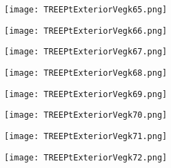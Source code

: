 \documentclass[pdf]{beamer}
\begin{document}
\begin{frame}
\begin{figure}[!h]
\centering
\texttt{[image: TREEPtExteriorVegk65.png]}
\end{figure}
\end{frame}

\begin{frame}
\begin{figure}[!h]
\centering
\texttt{[image: TREEPtExteriorVegk66.png]}
\end{figure}
\end{frame}

\begin{frame}
\begin{figure}[!h]
\centering
\texttt{[image: TREEPtExteriorVegk67.png]}
\end{figure}
\end{frame}

\begin{frame}
\begin{figure}[!h]
\centering
\texttt{[image: TREEPtExteriorVegk68.png]}
\end{figure}
\end{frame}

\begin{frame}
\begin{figure}[!h]
\centering
\texttt{[image: TREEPtExteriorVegk69.png]}
\end{figure}
\end{frame}

\begin{frame}
\begin{figure}[!h]
\centering
\texttt{[image: TREEPtExteriorVegk70.png]}
\end{figure}
\end{frame}

\begin{frame}
\begin{figure}[!h]
\centering
\texttt{[image: TREEPtExteriorVegk71.png]}
\end{figure}
\end{frame}

\begin{frame}
\begin{figure}[!h]
\centering
\texttt{[image: TREEPtExteriorVegk72.png]}
\end{figure}
\end{frame}
\end{document}
